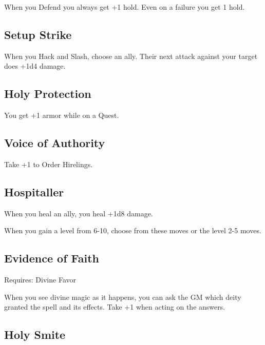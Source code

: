 When you Defend you always get +1 hold. Even on a failure you get 1 hold.

 
\subsection{Setup Strike}    
 

When you Hack and Slash, choose an ally. Their next attack against your target does +1d4 damage.

 
\subsection{Holy Protection}    
 

You get +1 armor while on a Quest.

 
\subsection{Voice of Authority}    
 

Take +1 to Order Hirelings.

 
\subsection{Hospitaller}   
 

When you heal an ally, you heal +1d8 damage.

 
\startInstructions
When you gain a level from 6-10, choose from these moves or the level 2-5 moves.
\stopInstructions
 
\subsection{Evidence of Faith}    
 

Requires: Divine Favor

 

When you see divine magic as it happens, you can ask the GM which deity granted the spell and its effects. Take +1 when acting on the answers.

 
\subsection{Holy Smite}    
 

